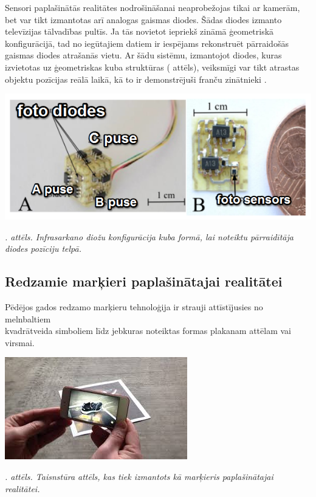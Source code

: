 \documentclass[12pt, a4paper, oneside, openright]{article}
\renewcommand{\thecimages}{\arabic{cimages}}
\begin{document}
\par
Sensori paplašinātās realitātes nodrošināšanai neaprobežojas tikai ar kamerām, bet var tikt izmantotas 
arī analogas gaismas diodes. Šādas diodes izmanto televīzijas tālvadības pultīs. Ja tās novietot iepriekš
zināmā ģeometriskā konfigurācijā, tad no iegūtajiem datiem ir iespējams rekonstruēt pārraidošās gaismas
diodes atrašanās vietu. Ar šādu sistēmu, izmantojot diodes, kuras izvietotas uz ģeometriskas kuba struktūras ( attēls), 
veiksmīgi var tikt atrastas objektu pozīcijas reālā laikā, kā to ir demonstrējuši franču zinātnieki \cite{ThibautRaharijaona2013}.

\label{cimages:ThibautRaharijaona2013_1}
\vspace{10pt}
\begin{samepage}
\begin{center}
\includegraphics[width=0.5\columnwidth]{images/ThibautRaharijaona2013_1.png}
\begin{center}
\footnotesize{
\textit{\thecimages. attēls. Infrasarkano diožu konfigurācija kuba formā, lai noteiktu pārraidītāja diodes pozīciju telpā.}}
\end{center}
\end{center}
\end{samepage}

\newpage
\subsection{Redzamie marķieri paplašinātajai realitātei}

\par
Pēdējos gados redzamo marķieru tehnoloģija ir strauji attīstījusies no melnbaltiem \\ kvadrātveida simboliem
līdz jebkuras noteiktas formas plakanam attēlam vai virsmai. 

\label{cimages:a2}
\vspace{10pt}
\begin{samepage}
\begin{center}
\includegraphics[width=0.5\columnwidth]{images/a2.jpg}
\begin{center}
\footnotesize{
\textit{\thecimages. attēls. Taisnstūra attēls, kas tiek izmantots kā marķieris paplašinātajai realitātei.}}
\end{center}
\end{center}
\end{samepage}
\end{document}
